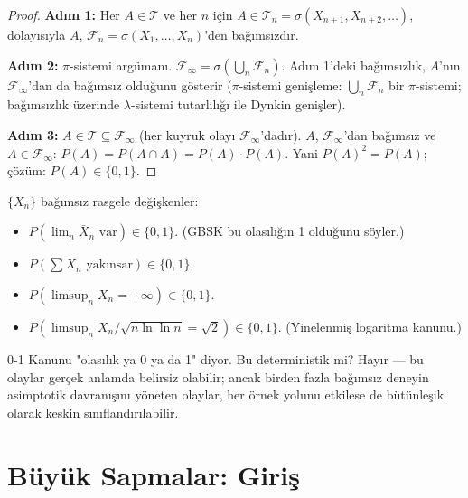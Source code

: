 \begin{proof}
\textbf{Adım 1:} Her $A \in \mathcal{T}$ ve her $n$ için $A \in \mathcal{T}_n = \sigma(X_{n+1}, X_{n+2}, \ldots)$,
dolayısıyla $A$, $\mathcal{F}_n = \sigma(X_1, \ldots, X_n)$'den bağımsızdır.

\textbf{Adım 2:} $\pi$-sistemi argümanı. $\mathcal{F}_\infty = \sigma(\bigcup_n \mathcal{F}_n)$.
Adım 1'deki bağımsızlık, $A$'nın $\mathcal{F}_\infty$'dan da bağımsız olduğunu gösterir
($\pi$-sistemi genişleme: $\bigcup_n \mathcal{F}_n$ bir $\pi$-sistemi; bağımsızlık üzerinde
$\lambda$-sistemi tutarlılığı ile Dynkin genişler).

\textbf{Adım 3:} $A \in \mathcal{T} \subseteq \mathcal{F}_\infty$ (her kuyruk olayı $\mathcal{F}_\infty$'dadır).
$A$, $\mathcal{F}_\infty$'dan bağımsız ve $A \in \mathcal{F}_\infty$:
$P(A) = P(A \cap A) = P(A) \cdot P(A)$.
Yani $P(A)^2 = P(A)$; çözüm: $P(A) \in \{0, 1\}$.
\end{proof}

\begin{ornek}
$\{X_n\}$ bağımsız rasgele değişkenler:
\begin{itemize}
  \item $P(\lim_n \bar{X}_n \text{ var}) \in \{0,1\}$. (GBSK bu olasılığın 1 olduğunu söyler.)
  \item $P(\sum X_n \text{ yakınsar}) \in \{0,1\}$.
  \item $P(\limsup_n X_n = +\infty) \in \{0,1\}$.
  \item $P(\limsup_n X_n/\sqrt{n\ln\ln n} = \sqrt{2}) \in \{0,1\}$. (Yinelenmiş logaritma kanunu.)
\end{itemize}
\end{ornek}

\begin{kritiksorgu}
0-1 Kanunu "olasılık ya 0 ya da 1" diyor. Bu deterministik mi?
Hayır --- bu olaylar gerçek anlamda belirsiz olabilir; ancak birden fazla bağımsız
deneyin asimptotik davranışını yöneten olaylar, her örnek yolunu etkilese de
bütünleşik olarak keskin sınıflandırılabilir.
\end{kritiksorgu}

\section{Büyük Sapmalar: Giriş}
\label{sec:buyuk_sapmalar}

